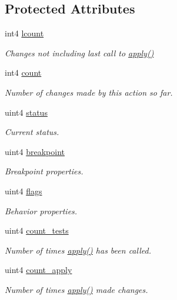 \subsection*{Protected Attributes}
\begin{DoxyCompactItemize}
\item 
int4 \mbox{\hyperlink{class_action_a83233dbe848a09bc1aab5e2c0942764e}{lcount}}
\begin{DoxyCompactList}\small\item\em Changes not including last call to \mbox{\hyperlink{class_action_aac1c3999d6c685b15f5d9765a4d04173}{apply()}} \end{DoxyCompactList}\item 
int4 \mbox{\hyperlink{class_action_aa544c614285cb70093a3cb623708679c}{count}}
\begin{DoxyCompactList}\small\item\em Number of changes made by this action so far. \end{DoxyCompactList}\item 
uint4 \mbox{\hyperlink{class_action_a4d1765a2b054acfc480c534d955a2887}{status}}
\begin{DoxyCompactList}\small\item\em Current status. \end{DoxyCompactList}\item 
uint4 \mbox{\hyperlink{class_action_a9389b626998d8725f9523188d3f2ef78}{breakpoint}}
\begin{DoxyCompactList}\small\item\em Breakpoint properties. \end{DoxyCompactList}\item 
uint4 \mbox{\hyperlink{class_action_a94208349db3026a47e0bcf3af6f51d55}{flags}}
\begin{DoxyCompactList}\small\item\em Behavior properties. \end{DoxyCompactList}\item 
uint4 \mbox{\hyperlink{class_action_adac1cdac8ebad4c833c74cfb33b5eecc}{count\+\_\+tests}}
\begin{DoxyCompactList}\small\item\em Number of times \mbox{\hyperlink{class_action_aac1c3999d6c685b15f5d9765a4d04173}{apply()}} has been called. \end{DoxyCompactList}\item 
uint4 \mbox{\hyperlink{class_action_ad732a3042b7d99ecba8bec5459ed0f32}{count\+\_\+apply}}
\begin{DoxyCompactList}\small\item\em Number of times \mbox{\hyperlink{class_action_aac1c3999d6c685b15f5d9765a4d04173}{apply()}} made changes. \end{DoxyCompactList}\item 

\end{DoxyCompactItemize}
